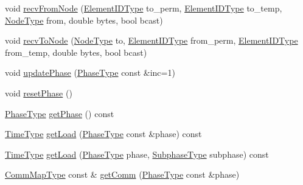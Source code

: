 \begin{DoxyCompactItemize}
\item 
void \hyperlink{structvt_1_1vrt_1_1collection_1_1balance_1_1_element_stats_af251d52d4d0be99a7745295148abcb4e}{recv\+From\+Node} (\hyperlink{namespacevt_1_1vrt_1_1collection_1_1balance_a14c8d2c972f2913aa3f1636e5be0a120}{Element\+I\+D\+Type} to\+\_\+perm, \hyperlink{namespacevt_1_1vrt_1_1collection_1_1balance_a14c8d2c972f2913aa3f1636e5be0a120}{Element\+I\+D\+Type} to\+\_\+temp, \hyperlink{namespacevt_a866da9d0efc19c0a1ce79e9e492f47e2}{Node\+Type} from, double bytes, bool bcast)
\item 
void \hyperlink{structvt_1_1vrt_1_1collection_1_1balance_1_1_element_stats_aa7eb11ba5b2787b129925d9f2cd0ac89}{recv\+To\+Node} (\hyperlink{namespacevt_a866da9d0efc19c0a1ce79e9e492f47e2}{Node\+Type} to, \hyperlink{namespacevt_1_1vrt_1_1collection_1_1balance_a14c8d2c972f2913aa3f1636e5be0a120}{Element\+I\+D\+Type} from\+\_\+perm, \hyperlink{namespacevt_1_1vrt_1_1collection_1_1balance_a14c8d2c972f2913aa3f1636e5be0a120}{Element\+I\+D\+Type} from\+\_\+temp, double bytes, bool bcast)
\item 
void \hyperlink{structvt_1_1vrt_1_1collection_1_1balance_1_1_element_stats_a6ba8726a871702870d76dca6de298d07}{update\+Phase} (\hyperlink{namespacevt_a46ce6733d5cdbd735d561b7b4029f6d7}{Phase\+Type} const \&inc=1)
\item 
void \hyperlink{structvt_1_1vrt_1_1collection_1_1balance_1_1_element_stats_a11818504121fc7bef9d0e218bd733475}{reset\+Phase} ()
\item 
\hyperlink{namespacevt_a46ce6733d5cdbd735d561b7b4029f6d7}{Phase\+Type} \hyperlink{structvt_1_1vrt_1_1collection_1_1balance_1_1_element_stats_a24fcc0af9fb6017b556828a52431bc1c}{get\+Phase} () const
\item 
\hyperlink{namespacevt_a876a9d0cd5a952859c72de8a46881442}{Time\+Type} \hyperlink{structvt_1_1vrt_1_1collection_1_1balance_1_1_element_stats_aeb819ff1258eda6a7a1ccbd51b256731}{get\+Load} (\hyperlink{namespacevt_a46ce6733d5cdbd735d561b7b4029f6d7}{Phase\+Type} const \&phase) const
\item 
\hyperlink{namespacevt_a876a9d0cd5a952859c72de8a46881442}{Time\+Type} \hyperlink{structvt_1_1vrt_1_1collection_1_1balance_1_1_element_stats_a04ffe937cfa084fb7bb52820312ec9c2}{get\+Load} (\hyperlink{namespacevt_a46ce6733d5cdbd735d561b7b4029f6d7}{Phase\+Type} phase, \hyperlink{namespacevt_ae78cbfdf1e57470e33eedb074f2beeba}{Subphase\+Type} subphase) const
\item 
\hyperlink{namespacevt_1_1vrt_1_1collection_1_1balance_a10860c956804d644db54a16012352728}{Comm\+Map\+Type} const  \& \hyperlink{structvt_1_1vrt_1_1collection_1_1balance_1_1_element_stats_a917ec0f6f274acc254c24c01fa66afa6}{get\+Comm} (\hyperlink{namespacevt_a46ce6733d5cdbd735d561b7b4029f6d7}{Phase\+Type} const \&phase)

\end{DoxyCompactItemize}

